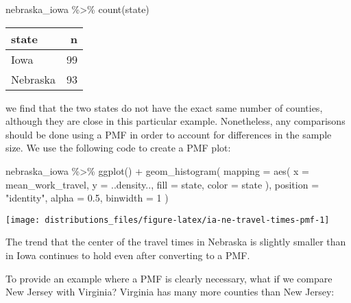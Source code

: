 \documentclass[
]{book}
\newenvironment{Shaded}{\begin{snugshade}}{\end{snugshade}}
\newcommand{\AttributeTok}[1]{\textcolor[rgb]{0.77,0.63,0.00}{#1}}
\newcommand{\DecValTok}[1]{\textcolor[rgb]{0.00,0.00,0.81}{#1}}
\newcommand{\FloatTok}[1]{\textcolor[rgb]{0.00,0.00,0.81}{#1}}
\newcommand{\FunctionTok}[1]{\textcolor[rgb]{0.00,0.00,0.00}{#1}}
\newcommand{\NormalTok}[1]{#1}
\newcommand{\SpecialCharTok}[1]{\textcolor[rgb]{0.00,0.00,0.00}{#1}}
\newcommand{\StringTok}[1]{\textcolor[rgb]{0.31,0.60,0.02}{#1}}
\begin{document}
\begin{Shaded}
\begin{Highlighting}[]
\NormalTok{nebraska\_iowa }\SpecialCharTok{\%\textgreater{}\%}
  \FunctionTok{count}\NormalTok{(state)}
\end{Highlighting}
\end{Shaded}

\begin{table}
\centering
\begin{tabular}{l|r}
\hline
state & n\\
\hline
Iowa & 99\\
\hline
Nebraska & 93\\
\hline
\end{tabular}
\end{table}

we find that the two states do not have the exact same number of counties, although they are close in this particular example.
Nonetheless, any comparisons should be done using a PMF in order to account for differences in the sample size.
We use the following code to create a PMF plot:

\begin{Shaded}
\begin{Highlighting}[]
\NormalTok{nebraska\_iowa }\SpecialCharTok{\%\textgreater{}\%} 
  \FunctionTok{ggplot}\NormalTok{() }\SpecialCharTok{+}
  \FunctionTok{geom\_histogram}\NormalTok{(}
    \AttributeTok{mapping =} \FunctionTok{aes}\NormalTok{(}
      \AttributeTok{x =}\NormalTok{ mean\_work\_travel,}
      \AttributeTok{y =}\NormalTok{ ..density..,}
      \AttributeTok{fill =}\NormalTok{ state,}
      \AttributeTok{color =}\NormalTok{ state}
\NormalTok{    ),}
    \AttributeTok{position =} \StringTok{"identity"}\NormalTok{, }\AttributeTok{alpha =} \FloatTok{0.5}\NormalTok{, }\AttributeTok{binwidth =} \DecValTok{1}
\NormalTok{  )}
\end{Highlighting}
\end{Shaded}

\begin{center}\texttt{[image: distributions\_files/figure-latex/ia-ne-travel-times-pmf-1]} \end{center}

The trend that the center of the travel times in Nebraska is slightly smaller than in Iowa continues to hold even after converting to a PMF.

To provide an example where a PMF is clearly necessary, what if we compare New Jersey with Virginia?
Virginia has many more counties than New Jersey:
\end{document}
